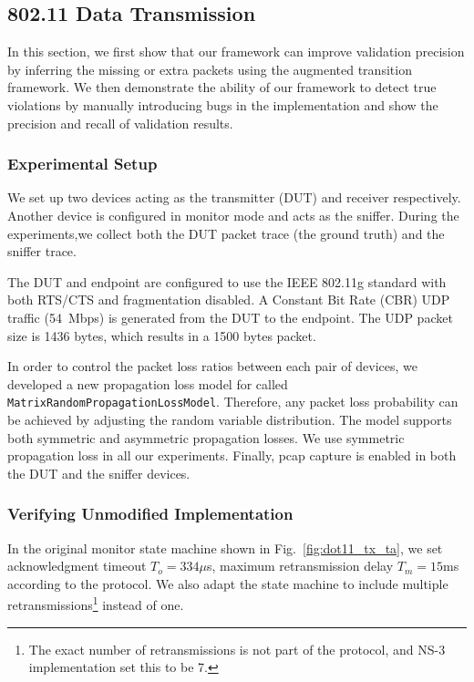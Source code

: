 \subsection{802.11 Data Transmission}
\label{subsec:tx}

In this section, we first show that our framework can improve validation
precision by inferring the missing or extra packets using the augmented
transition framework. We then demonstrate the ability of our framework to detect
true violations by manually introducing bugs in the \ns{} implementation and
show the precision and recall of validation results.


\subsubsection{Experimental Setup}

We set up two \wifi{} devices acting as the transmitter (DUT) and receiver
respectively. Another \wifi{} device is configured in monitor mode and acts as
the sniffer. During the experiments,we collect both the DUT packet trace
(the ground truth) and the sniffer trace.

The DUT and endpoint are configured to use the IEEE 802.11g standard with both
RTS/CTS and fragmentation disabled.  A Constant Bit Rate (CBR) UDP traffic
(54~Mbps) is generated from the DUT to the endpoint.  The UDP packet size is
1436 bytes, which results in a 1500 bytes \wifi{} packet.

In order to control the packet loss ratios between each pair of devices, we
developed a new propagation loss model for \ns{} called
\texttt{MatrixRandomPropagationLossModel}.
Therefore, any packet loss
probability can be achieved by adjusting the random variable distribution.
The
model supports both symmetric and asymmetric propagation losses.
We use
symmetric propagation loss in all our experiments.
Finally, pcap capture is enabled in both the DUT and the sniffer devices.

\subsubsection{Verifying Unmodified Implementation}

In the original monitor state machine shown in Fig.~\ref{fig:dot11_tx_ta}, we
set acknowledgment timeout $T_o=334\mu$s, maximum retransmission delay
$T_m=15$ms according to the protocol. We also adapt the state machine to include
multiple retransmissions\footnote{The exact number of retransmissions is not
part of the protocol, and NS-3 implementation set this to be 7.} instead of one.

